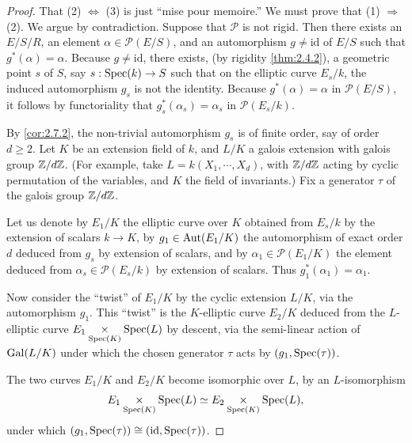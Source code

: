 \begin{proof}
That (2) $\Longleftrightarrow$ (3) is just ``mise pour memoire.'' We must prove that (1) $\Longrightarrow$ (2). We argue by contradiction. Suppose that $\mathcal{P}$ is not rigid. Then there exists an $E/S/R$, an element $\alpha \in \mathcal{P}(E/S)$, and an automorphism $g \ne \mathrm{id}$ of $E/S$ such that $g^*(\alpha) = \alpha$. Because $g \ne \mathrm{id}$, there exists, (by rigidity \ref{thm:2.4.2}), a geometric point $s$ of $S$, say $s : \operatorname{Spec}(k) \to S$ such that on the elliptic curve $E_s/k$, the induced automorphism $g_s$ is not the identity. Because $g^*(\alpha) = \alpha$ in $\mathcal{P}(E/S)$, it follows by functoriality that $g_s^*(\alpha_s) = \alpha_s$ in $\mathcal{P}(E_s/k)$.

By \ref{cor:2.7.2}, the non-trivial automorphism $g_s$ is of finite order, say of order $d \ge 2$. Let $K$ be an extension field of $k$, and $L/K$ a galois extension with galois group $\mathbb{Z}/d\mathbb{Z}$. (For example, take $L = k(X_1, \cdots, X_d)$, with $\mathbb{Z}/d\mathbb{Z}$ acting by cyclic permutation of the variables, and $K$ the field of invariants.) Fix a generator $\tau$ of the galois group $\mathbb{Z}/d\mathbb{Z}$.

Let us denote by $E_1/K$ the elliptic curve over $K$ obtained from $E_s/k$ by the extension of scalars $k \to K$, by $g_1 \in \operatorname{Aut}(E_1/K)$ the automorphism of exact order $d$ deduced from $g_s$ by extension of scalars, and by $\alpha_1 \in \mathcal{P}(E_1/K)$ the element deduced from $\alpha_s \in \mathcal{P}(E_s/k)$ by extension of scalars. Thus $g_1^*(\alpha_1) = \alpha_1$.

Now consider the ``twist'' of $E_1/K$ by the cyclic extension $L/K$, via the automorphism $g_1$. This ``twist'' is the $K$-elliptic curve $E_2/K$ deduced from the $L$-elliptic curve $E_1 \underset{\operatorname{Spec}(K)}{\times} \operatorname{Spec}(L)$ by descent, via the semi-linear action of $\operatorname{Gal}(L/K)$ under which the chosen generator $\tau$ acts by $(g_1, \operatorname{Spec}(\tau))$.

The two curves $E_1/K$ and $E_2/K$ become isomorphic over $L$, by an $L$-isomorphism
\[
E_1 \underset{\operatorname{Spec}(K)}{\times} \operatorname{Spec}(L) \simeq E_2 \underset{\operatorname{Spec}(K)}{\times} \operatorname{Spec}(L),
\]
under which $(g_1, \operatorname{Spec}(\tau)) \cong (\mathrm{id}, \operatorname{Spec}(\tau))$.


\end{proof}
